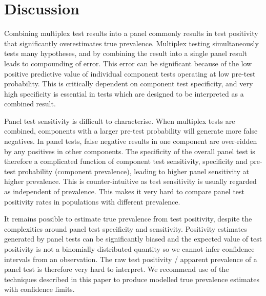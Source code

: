 \documentclass[10pt,letterpaper]{article}
\begin{document}
\section*{Discussion}

Combining multiplex test results into a panel commonly results in test positivity that significantly overestimates true prevalence. Multiplex testing simultaneously tests many hypotheses, and by combining the result into a single panel result leads to compounding of error. This error can be significant because of the low positive predictive value of individual component tests operating at low pre-test probability. This is critically dependent on component test specificity, and very high specificity is essential in tests which are designed to be interpreted as a combined result.

Panel test sensitivity is difficult to characterise. When multiplex tests are combined, components with a larger pre-test probability will generate more false negatives. In panel tests, false negative results in one component are over-ridden by any positives in other components. The specificity of the overall panel test is therefore a complicated function of component test sensitivity, specificity and pre-test probability (component prevalence), leading to higher panel sensitivity at higher prevalence. This is counter-intuitive as test sensitivity is usually regarded as independent of prevalence. This makes it very hard to compare panel test positivity rates in populations with different prevalence.

It remains possible to estimate true prevalence from test positivity, despite the complexities around panel test specificity and sensitivity. Positivity estimates generated by panel tests can be significantly biased and the expected value of test positivity is not a binomially distributed quantity so we cannot infer confidence intervals from an observation. The raw test positivity / apparent prevalence of a panel test is therefore very hard to interpret. We recommend use of the techniques described in this paper to produce modelled true prevalence estimates with confidence limits.
\end{document}
